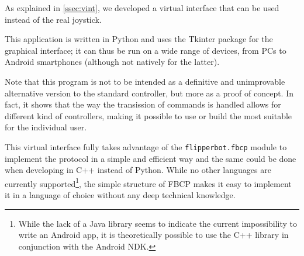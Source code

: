 As explained in \autoref{ssec:vint}, we developed a virtual interface that can
be used instead of the real joystick.

This application is written in Python and uses the Tkinter package for the
graphical interface; it can thus be run on a wide range of devices, from PCs
to Android smartphones (although not natively for the latter).

Note that this program is not to be intended as a definitive and unimprovable
alternative version to the standard controller, but more as a proof of concept.
In fact, it shows that the way the transission of commands is handled allows for
different kind of controllers, making it possible to use or build the most
suitable for the individual user.

This virtual interface fully takes advantage of the \Verb|flipperbot.fbcp|
module to implement the protocol in a simple and efficient way and the same
could be done when developing in C++ instead of Python. While no other languages
are currently supported\footnote{While the lack of a Java library seems to
indicate the current impossibility to write an Android app, it is theoretically
possible to use the C++ library in conjunction with the Android NDK.}, the simple structure of FBCP makes it easy
to implement it in a language of choice without any deep technical knowledge.
